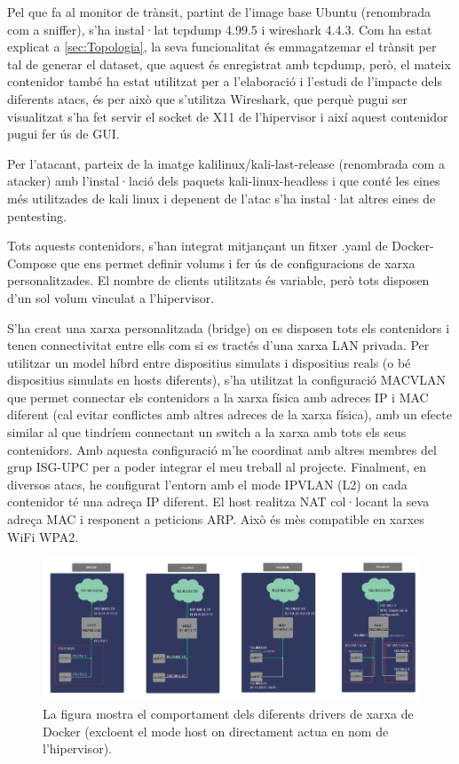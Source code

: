 Pel que fa al monitor de trànsit, partint de l’image base Ubuntu (renombrada com a sniffer), s’ha instal·lat tcpdump 4.99.5 i wireshark 4.4.3. Com ha estat explicat a \ref{sec:Topologia}, la seva funcionalitat és emmagatzemar el trànsit per tal de generar el dataset, que aquest és enregistrat amb tcpdump, però, el mateix contenidor també ha estat utilitzat per a l’elaboració i l’estudi de l’impacte dels diferents atacs, és per això que s’utilitza Wireshark, que perquè pugui ser visualitzat s’ha fet servir el socket de X11 de l’hipervisor i així aquest contenidor pugui fer ús de GUI.

Per l’atacant, parteix de la imatge kalilinux/kali-last-release \cite{kaliimg} (renombrada com a atacker) amb l’instal·lació dels paquets kali-linux-headless i que conté les eines més utilitzades de kali linux i depenent de l’atac s’ha instal·lat altres eines de pentesting.

Tots aquests contenidors, s’han integrat mitjançant un fitxer .yaml de Docker-Compose que ens permet definir volums i fer ús de configuracions de xarxa personalitzades. El nombre de clients utilitzats és variable, però tots disposen d’un sol volum vinculat a l'hipervisor.

S’ha creat una xarxa personalitzada (bridge) on es disposen tots els contenidors i tenen connectivitat entre ells com si es tractés d'una xarxa LAN privada. 
Per utilitzar un model híbrd entre dispositius simulats i dispositius reals (o bé dispositius simulats en hosts diferents), s’ha utilitzat la configuració MACVLAN que permet connectar els contenidors a la xarxa física amb adreces IP i MAC diferent (cal evitar conflictes amb altres adreces de la xarxa física), amb un efecte similar al que tindríem connectant un switch a la xarxa amb tots els seus contenidors. Amb aquesta configuració m'he coordinat amb altres membres del grup ISG-UPC per a poder integrar el meu treball al projecte. 
Finalment, en diversos atacs, he configurat l'entorn amb el mode IPVLAN (L2) on cada contenidor té una adreça IP diferent. El host realitza NAT col·locant la seva adreça MAC i responent a peticions ARP. Això és mès compatible en xarxes WiFi WPA2.

 \begin{figure}[H]
    \centering
    \includegraphics[width=1\textwidth]{img/DockerNetworks.png}
    \caption{La figura mostra el comportament dels diferents drivers de xarxa de Docker (excloent el mode host on directament actua en nom de l'hipervisor).}
    \label{fig:DockerNetworks}
  \end{figure}